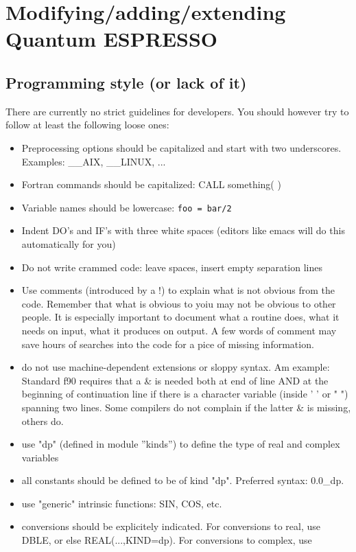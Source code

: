 \documentclass[12pt,a4paper]{article}
\def\qe{{\sc Quantum ESPRESSO}}
\begin{document}
\section{Modifying/adding/extending \qe}

\subsection{Programming style (or lack of it)}

There are currently no strict guidelines for developers. You
should however try to follow at least the following loose ones:
\begin{itemize}
\item Preprocessing options should be capitalized and start with 
two underscores. Examples: \_\_AIX, \_\_LINUX, ...
\item Fortran commands should be capitalized: 
CALL something( )
\item Variable names should be lowercase: \texttt{foo = bar/2}
\item Indent DO's and IF's with three white spaces (editors like emacs will do this automatically for you)
\item Do not write crammed code: leave spaces, insert empty separation lines
\item Use comments (introduced by a !) to explain what is not obvious from 
the code. Remember that what is obvious to yoiu may not be obvious to other 
people. It is especially important to document what a routine does, what
it needs on input, what it produces on output. A few words of comment
may save hours of searches into the code for a pice of missing information.
\item do not use machine-dependent extensions or sloppy syntax. Am example:
Standard f90 
requires that a \& is needed both at end of line AND at the beginning of 
continuation line if there is a character variable (inside ' ' or " ")
spanning two lines. Some compilers do not complain if the latter \& is 
missing, others do.
\item use "dp" (defined in module ''kinds'') to define the type of real and complex variables
\item all constants should be defined to be of kind "dp".  Preferred syntax: 0.0\_dp.
\item use "generic" intrinsic functions: SIN, COS, etc.
\item conversions should be explicitely indicated. For conversions to real, 
use DBLE, or else REAL(...,KIND=dp). For conversions to complex, use 

\end{itemize}
\end{document}
